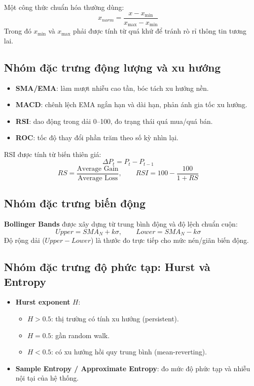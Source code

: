 \documentclass[12pt,a4paper]{article}
\begin{document}
Một công thức chuẩn hóa thường dùng:
\begin{equation}
x_{norm}=\frac{x-x_{\min}}{x_{\max}-x_{\min}}
\end{equation}
Trong đó $x_{\min}$ và $x_{\max}$ phải được tính từ quá khứ để tránh rò rỉ thông tin tương lai.

\subsection{Nhóm đặc trưng động lượng và xu hướng}
\begin{itemize}[leftmargin=1.5em]
  \item \textbf{SMA/EMA}: làm mượt nhiễu cao tần, bóc tách xu hướng nền.
  \item \textbf{MACD}: chênh lệch EMA ngắn hạn và dài hạn, phản ánh gia tốc xu hướng.
  \item \textbf{RSI}: dao động trong dải 0--100, đo trạng thái quá mua/quá bán.
  \item \textbf{ROC}: tốc độ thay đổi phần trăm theo số kỳ nhìn lại.
\end{itemize}

RSI được tính từ biến thiên giá:
\begin{equation}
\Delta P_t=P_t-P_{t-1}
\end{equation}
\begin{equation}
RS=\frac{\text{Average Gain}}{\text{Average Loss}},\qquad RSI=100-\frac{100}{1+RS}
\end{equation}

\subsection{Nhóm đặc trưng biến động}
\textbf{Bollinger Bands} được xây dựng từ trung bình động và độ lệch chuẩn cuộn:
\begin{equation}
Upper=SMA_N+k\sigma,\qquad Lower=SMA_N-k\sigma
\end{equation}
Độ rộng dải ($Upper-Lower$) là thước đo trực tiếp cho mức nén/giãn biến động.

\subsection{Nhóm đặc trưng độ phức tạp: Hurst và Entropy}
\begin{itemize}[leftmargin=1.5em]
  \item \textbf{Hurst exponent} $H$:
  \begin{itemize}[leftmargin=1.5em]
    \item $H>0.5$: thị trường có tính xu hướng (persistent).
    \item $H=0.5$: gần random walk.
    \item $H<0.5$: có xu hướng hồi quy trung bình (mean-reverting).
  \end{itemize}
  \item \textbf{Sample Entropy / Approximate Entropy}: đo mức độ phức tạp và nhiễu nội tại của hệ thống.
\end{itemize}
\end{document}

